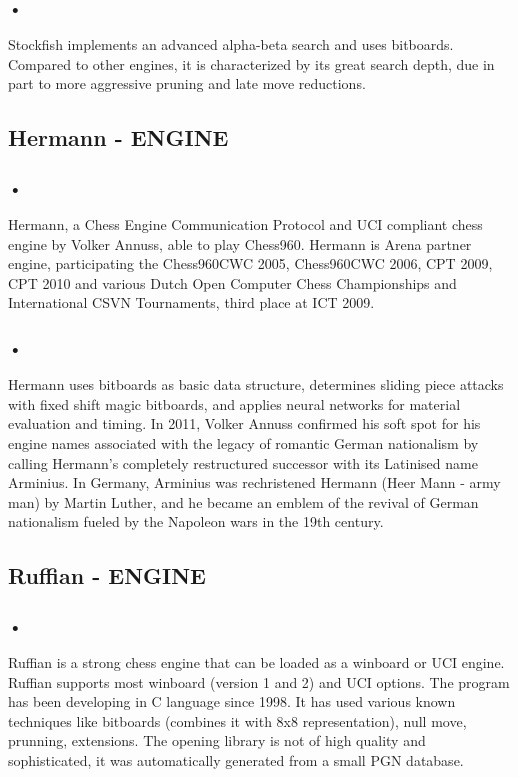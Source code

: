\documentclass{svproc}
\begin{document}
\subsubsection{•}
Stockfish implements an advanced alpha-beta search and uses bitboards. Compared to other engines, it is characterized by its great search depth, due in part to more aggressive pruning and late move reductions. 

\subsection{Hermann - ENGINE}

\subsubsection{•}
Hermann, a Chess Engine Communication Protocol and UCI compliant chess engine by Volker Annuss, able to play Chess960. Hermann is Arena partner engine, participating the Chess960CWC 2005, Chess960CWC 2006, CPT 2009, CPT 2010 and various Dutch Open Computer Chess Championships and International CSVN Tournaments, third place at ICT 2009.

\subsubsection{•}
Hermann uses bitboards as basic data structure, determines sliding piece attacks with fixed shift magic bitboards, and applies neural networks for material evaluation and timing. In 2011, Volker Annuss confirmed his soft spot for his engine names associated with the legacy of romantic German nationalism by calling Hermann's completely restructured successor with its Latinised name Arminius. In Germany, Arminius was rechristened Hermann (Heer Mann - army man) by Martin Luther, and he became an emblem of the revival of German nationalism fueled by the Napoleon wars in the 19th century.

\subsection{Ruffian - ENGINE}

\subsubsection{•}
Ruffian is a strong chess engine that can be loaded as a winboard or 
UCI engine. Ruffian supports most winboard (version 1 and 2) and UCI
options. The program has been developing in C language since 1998. It has used various known techniques like bitboards (combines it with 8x8 representation), null move, prunning, extensions. The opening library is not of high quality and sophisticated, it was automatically generated from a small PGN database.
\end{document}
